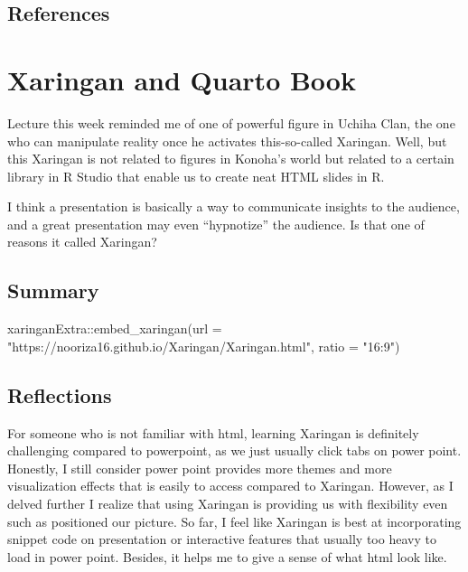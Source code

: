 \documentclass[
  letterpaper,
  DIV=11,
  numbers=noendperiod]{scrreprt}
\newenvironment{Shaded}{\begin{snugshade}}{\end{snugshade}}
\newcommand{\AttributeTok}[1]{\textcolor[rgb]{0.40,0.45,0.13}{#1}}
\newcommand{\FunctionTok}[1]{\textcolor[rgb]{0.28,0.35,0.67}{#1}}
\newcommand{\NormalTok}[1]{\textcolor[rgb]{0.00,0.23,0.31}{#1}}
\newcommand{\SpecialCharTok}[1]{\textcolor[rgb]{0.37,0.37,0.37}{#1}}
\newcommand{\StringTok}[1]{\textcolor[rgb]{0.13,0.47,0.30}{#1}}
\begin{document}
\hypertarget{references}{%
\section{References}\label{references}}


\hypertarget{xaringan-and-quarto-book}{%
\chapter{Xaringan and Quarto Book}\label{xaringan-and-quarto-book}}

Lecture this week reminded me of one of powerful figure in Uchiha Clan,
the one who can manipulate reality once he activates this-so-called
Xaringan. Well, but this Xaringan is not related to figures in Konoha's
world but related to a certain library in R Studio that enable us to
create neat HTML slides in R.

I think a presentation is basically a way to communicate insights to the
audience, and a great presentation may even ``hypnotize'' the audience.
Is that one of reasons it called Xaringan?

\hypertarget{summary-1}{%
\section{Summary}\label{summary-1}}

\begin{Shaded}
\begin{Highlighting}[]
\NormalTok{xaringanExtra}\SpecialCharTok{::}\FunctionTok{embed\_xaringan}\NormalTok{(}\AttributeTok{url =} \StringTok{"https://nooriza16.github.io/Xaringan/Xaringan.html"}\NormalTok{, }\AttributeTok{ratio =} \StringTok{"16:9"}\NormalTok{)}
\end{Highlighting}
\end{Shaded}

\hypertarget{reflections}{%
\section{Reflections}\label{reflections}}

For someone who is not familiar with html, learning Xaringan is
definitely challenging compared to powerpoint, as we just usually click
tabs on power point. Honestly, I still consider power point provides
more themes and more visualization effects that is easily to access
compared to Xaringan. However, as I delved further I realize that using
Xaringan is providing us with flexibility even such as positioned our
picture. So far, I feel like Xaringan is best at incorporating snippet
code on presentation or interactive features that usually too heavy to
load in power point. Besides, it helps me to give a sense of what html
look like.
\end{document}
